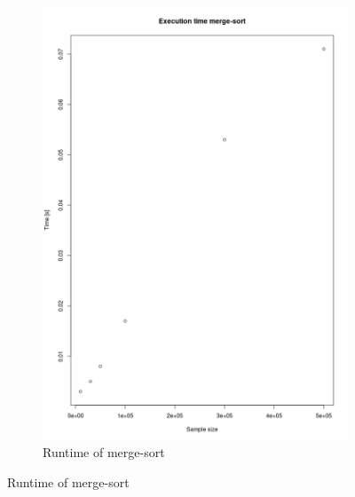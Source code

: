 \documentclass[a4paper]{scrartcl}
\begin{document}
\begin{figure}
\begin{subfigure}{.5\textwidth}
    \end{subfigure}%
    \begin{subfigure}{.5\textwidth}
      \centering
      \caption{Runtime of merge-sort}
      \includegraphics[width=\linewidth]{resources/merge_sort.png}
    \end{subfigure}
\end{figure}
\end{document}
